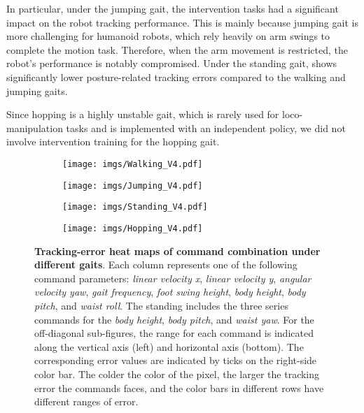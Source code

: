 In particular, under the jumping gait, the intervention tasks had a significant impact on the robot tracking performance. This is mainly because jumping gait is more challenging for humanoid robots, which rely heavily on arm swings to complete the motion task. Therefore, when the arm movement is restricted, the robot's performance is notably compromised.
Under the standing gait, \our shows significantly lower posture-related tracking errors compared to the walking and jumping gaits. 

Since hopping is a highly unstable gait, which is rarely used for loco-manipulation tasks and is implemented with an independent policy, we did not involve intervention training for the hopping gait.


\begin{figure*}[htbp]
    \centering
\begin{subfigure}[htbp]{\textwidth}
    \texttt{[image: imgs/Walking\_V4.pdf]}
    \label{fig:heatmapwalk}
\end{subfigure}
\end{figure*}
\begin{figure*}[htbp]\ContinuedFloat
\begin{subfigure}[htbp]{\textwidth}
    \texttt{[image: imgs/Jumping\_V4.pdf]}
    \label{fig:heatmapjump}
\end{subfigure}
\end{figure*}
\begin{figure*}[htbp]\ContinuedFloat
\begin{subfigure}[htbp]{0.49\textwidth}
    \texttt{[image: imgs/Standing\_V4.pdf]}
    \label{fig:heatmapstand}
\end{subfigure}
\begin{subfigure}[htbp]{0.49\textwidth}
    \texttt{[image: imgs/Hopping\_V4.pdf]}
    \label{fig:heatmaphopping}
\end{subfigure}
\caption{\small \textbf{Tracking-error heat maps of command combination under different gaits}. Each column represents one of the following command parameters: \emph{linear velocity x}, \emph{linear velocity y}, \emph{angular velocity yaw}, \emph{gait frequency}, \emph{foot swing height}, \emph{body height}, \emph{body pitch}, and \emph{waist roll}. The standing includes the three series commands for the \emph{body height}, \emph{body pitch}, and \emph{waist yaw}.
For the off-diagonal sub-figures, the range for each command is indicated along the vertical axis (left) and horizontal axis (bottom). The corresponding error values are indicated by ticks on the right-side color bar. 
The colder %
the color of the pixel, the larger the tracking error the commands faces, and the color bars in different rows have different ranges of error.}
\label{fig:Heatmaps}
\end{figure*}

